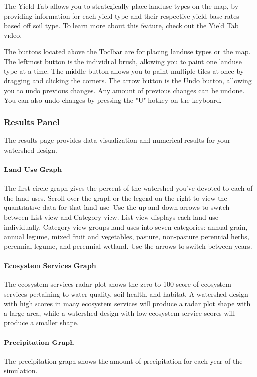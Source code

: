 \documentclass[11pt]{article}
\begin{document}
\begin{itemize}
The Yield Tab allows you to strategically place landuse types on the map, by providing information for each yield type and their respective yield base rates based off soil type. To learn more about this feature, check out the Yield Tab video.

The buttons located above the Toolbar are for placing landuse types on the map. The leftmost button is the individual brush, allowing you to paint one landuse type at a time. The middle button allows you to paint multiple tiles at once by dragging and clicking the corners. The arrow button is the Undo button, allowing you to undo previous changes. Any amount of previous changes can be undone. You can also undo changes by pressing the "U" hotkey on the keyboard. 

\subsubsection{Results Panel}
The results page provides data visualization and numerical results for your watershed design.

\paragraph{Land Use Graph}
The first circle graph gives the percent of the watershed you’ve devoted to each of the land uses. Scroll over the graph or the legend on the right to view the quantitative data for that land use. Use the up and down arrows to switch between List view and Category view. List view displays each land use individually. Category view groups land uses into seven categories: annual grain, annual legume, mixed fruit and vegetables, pasture, non-pasture perennial herbs, perennial legume, and perennial wetland. Use the arrows to switch between years. 

\paragraph{Ecosystem Services Graph}
The ecosystem services radar plot shows the zero-to-100 score of ecosystem services pertaining to water quality, soil health, and habitat. A watershed design with high scores in many ecosystem services will produce a radar plot shape with a large area, while a watershed design with low ecosystem service scores will produce a smaller shape. 

\paragraph{Precipitation Graph}
The precipitation graph shows the amount of precipitation for each year of the simulation. 


\end{itemize}
\end{document}
